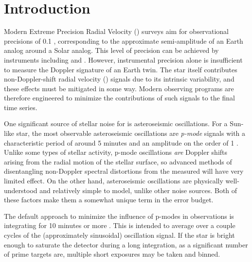 \documentclass[modern]{aastex62}
\begin{document}
\section{Introduction}
\label{s:intro}

Modern Extreme Precision Radial Velocity (\EPRV) surveys aim for observational precisions of 0.1 \ms, corresponding to the approximate semi-amplitude of an Earth analog around a Solar analog. 
This level of precision can be achieved by instruments including \EXPRES and \ESPRESSO \citep{Petersburg2020, Pepe2021}. 
However, instrumental precision alone is insufficient to measure the Doppler signature of an Earth twin. 
The star itself contributes non-Doppler-shift radial velocity (\RV) signals due to its intrinsic variability, and these effects must be mitigated in some way. 
Modern observing programs are therefore engineered to minimize the contributions of such signals to the final \RV time series.

One significant source of stellar noise for \EPRV is asteroseismic oscillations. 
For a Sun-like star, the most observable asteroseismic oscillations are \textit{p-mode} signals with a characteristic period of around 5 minutes and an amplitude on the order of 1 \ms. 
Unlike some types of stellar activity, p-mode oscillations \textit{are} Doppler shifts arising from the radial motion of the stellar surface, so advanced methods of disentangling non-Doppler spectral distortions from the measured \RV will have very limited effect. 
On the other hand, asteroseismic oscillations are physically well-understood and relatively simple to model, unlike other \RV noise sources. 
Both of these factors make them a somewhat unique term in the \EPRV error budget.

The default approach to minimize the influence of p-modes in \EPRV observations is integrating for 10 minutes or more \citep{Dumusque2011}. 
This is intended to average over a couple cycles of the (approximately sinusoidal) oscillation signal. 
If the star is bright enough to saturate the detector during a long integration, as a significant number of prime \EPRV targets are, multiple short exposures may be taken and binned. 
\end{document}

